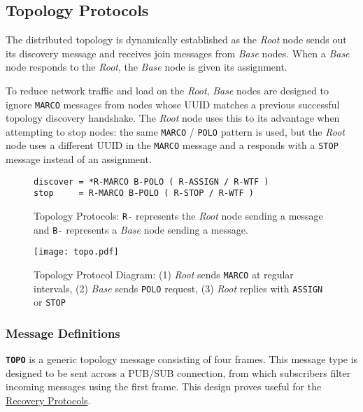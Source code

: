 \subsection{Topology Protocols}
\label{proto_topo}

The \dcamp distributed topology is dynamically established as the \textit{Root} node sends out its discovery message and
receives join messages from \textit{Base} nodes. When a \textit{Base} node responds to the \textit{Root}, the
\textit{Base} node is given its assignment.

To reduce network traffic and load on the \textit{Root}, \textit{Base} nodes are designed to ignore \texttt{MARCO}
messages from nodes whose UUID matches a previous successful topology discovery handshake. The \textit{Root} node uses
this to its advantage when attempting to stop nodes: the same \texttt{MARCO} / \texttt{POLO} pattern is used, but the
\textit{Root} node uses a different UUID in the \texttt{MARCO} message and a responds with a \texttt{STOP} message
instead of an assignment.

\begin{figure}[H]
\vspace{+10pt}
\begin{verbatim}
discover = *R-MARCO B-POLO ( R-ASSIGN / R-WTF )
stop     = R-MARCO B-POLO ( R-STOP / R-WTF )
\end{verbatim}
\vspace{-5pt}
\caption[Topology Protocols]
	{Topology Protocols: \texttt{R-} represents the \textit{Root} node sending a message and \texttt{B-}
         represents a \textit{Base} node sending a message.}
\label{fig:proto_topo_spec}
\end{figure}

\begin{figure}[H]
    \centering
    \texttt{[image: topo.pdf]}
    \label{fig:proto_topo_image}
    \caption[Topology Protocol Diagram]
	    {Topology Protocol Diagram: (1) \textit{Root} sends \texttt{MARCO} at regular intervals, (2) \textit{Base}
	     sends \texttt{POLO} request, (3) \textit{Root} replies with  \texttt{ASSIGN} or \texttt{STOP}}
\end{figure}

\subsubsection{Message Definitions}

\textbf{\texttt{TOPO}} is a generic topology message consisting of four frames. This message type is designed to be sent
across a PUB/SUB connection, from which subscribers filter incoming messages using the first frame. This design proves
useful for the \hyperref[proto_reco]{Recovery Protocols}.

